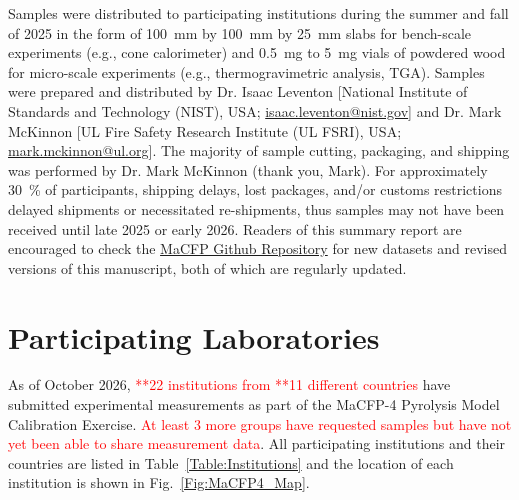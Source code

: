 \documentclass{book}
\begin{document}
Samples were distributed to participating institutions during the summer and fall of 2025 in the form of 100~mm by 100~mm by 25~mm slabs for bench-scale experiments (e.g., cone calorimeter) and 0.5~mg to 5~mg vials of powdered wood for micro-scale experiments (e.g., thermogravimetric analysis, TGA). Samples were prepared and distributed by Dr. Isaac Leventon [National Institute of Standards and Technology (NIST), USA; \href{mailto:isaac.leventon@nist.gov}{isaac.leventon@nist.gov}] and Dr. Mark McKinnon [UL Fire Safety Research Institute (UL FSRI), USA; \href{mailto:mark.mckinnon@ul.org}{mark.mckinnon@ul.org}]. The majority of sample cutting, packaging, and shipping was performed by Dr. Mark McKinnon (thank you, Mark). For approximately 30~\% of participants, shipping delays, lost packages, and/or customs restrictions delayed shipments or necessitated re-shipments, thus samples may not have been received until late 2025 or early 2026. Readers of this summary report are encouraged to check the \href{https://github.com/MaCFP/matl-db/releases}{MaCFP Github Repository} for new datasets and revised versions of this manuscript, both of which are regularly updated.

\section{Participating Laboratories}
\thispagestyle{fancy}
As of October 2026, \textcolor{red}{**22 institutions from **11 different countries} have submitted experimental measurements as part of the MaCFP-4 Pyrolysis Model Calibration Exercise. \textcolor{red}{At least 3 more groups have requested samples but have not yet been able to share measurement data}. All participating institutions and their countries are listed in Table~\ref{Table:Institutions} and the location of each institution is shown in Fig.~\ref{Fig:MaCFP4_Map}.

\end{document}

